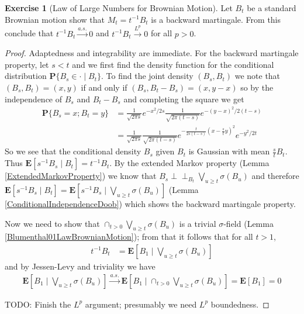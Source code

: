 \documentclass{amsbook}
\theoremstyle{definition}
\newtheorem{xca}{Exercise}
\theoremstyle{remark}
\newcommand{\Independent}{\perp \! \! \! \perp}
\newcommand{\cindependent}[3]{#1 \Independent_{#3} #2}
\newcommand{\expectation}[1]{\textbf{E}\left[#1\right]}
\newcommand{\cexpectationlong}[2]{\textbf{E}\left[ #2 \mid #1 \right]}
\newcommand{\probability}[1]{\textbf{P}\{#1\}}
\newcommand{\cprobability}[2]{\textbf{P}\{#2 \mid #1\}}
\newcommand{\toas}{\overset{a.s.}\to}
\newcommand{\tolp}[1]{\overset{L^#1}\to}
\begin{document}
\begin{xca}[Law of Large Numbers for Brownian Motion]Let $B_t$ be a standard Brownian motion show that $M_t =
  t^{-1}B_t$ is a backward martingale.  From this conclude that
  $t^{-1}B_t \toas 0$ and $t^{-1}B_t \tolp{p} 0$ for all $p > 0$.
\end{xca}
\begin{proof}
Adaptedness and integrability are immediate.  For the backward
martingale property, let $s < t$ and we first find the density function for the
conditional distribution $\cprobability{B_t}{B_s \in \cdot}$.  To find
the joint density $(B_s, B_t)$ we note that $(B_s,B_t) = (x,y)$ if and
only if $(B_s,B_t - B_s) = (x, y - x)$ so by the independence of $B_s$
and $B_t - B_s$ and completing the square we get
\begin{align*}
\probability{B_s = x ; B_t = y} &= \frac{1}{\sqrt{2\pi s} } e^{-x^2/2s}
  \frac{1}{\sqrt{2\pi(t- s)}} e^{-(y-x)^2/2(t-s)} \\
&= \frac{1}{\sqrt{2\pi s}} \frac{1}{\sqrt{2\pi(t- s)}}
    e^{-\frac{t}{2s(t-s)}(x - \frac{s}{t}y)^2} e^{-y^2/2t}
\end{align*}
So we see that the conditional density $B_s$ given $B_t$ is Gaussian
with mean $\frac{s}{t} B_t$.  Thus $\cexpectationlong{B_t}{s^{-1} B_s}
= t^{-1} B_t$.  By the extended Markov property (Lemma
\ref{ExtendedMarkovProperty}) we know that $\cindependent{B_s}{\bigvee_{u \geq t}\sigma(
    B_u)}{B_t}$ and therefore $\cexpectationlong{B_t}{s^{-1} B_s} = \cexpectationlong{\bigvee_{u \geq t}\sigma(
    B_u)}{s^{-1} B_s}$ (Lemma \ref{ConditionalIndependenceDoob}) which
  shows the backward martingale property.

Now we need to show that $\cap_{t > 0} \bigvee_{u \geq t} \sigma(B_u)$
is a trivial $\sigma$-field (Lemma \ref{Blumenthal01LawBrownianMotion});
from that it follows that for all $t > 1$, 
\begin{align*}
t^{-1} B_t &= \cexpectationlong{\bigvee_{u \geq t} \sigma(B_u)}{B_1} 
\end{align*}
and by Jessen-Levy and triviality we have 
\begin{align*}
\cexpectationlong{\bigvee_{u \geq t}
  \sigma(B_u)}{B_1} \toas \cexpectationlong{\cap_{t>0} \bigvee_{u \geq t}
  \sigma(B_u)}{B_1} = \expectation{B_1} = 0
\end{align*}

TODO: Finish the $L^p$ argument; presumably we need $L^p$ boundedness.
\end{proof}
\end{document}
